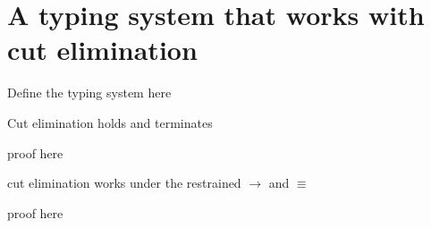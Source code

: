 
\section{A typing system that works with cut elimination}

\begin{definition}
Define the typing system here
\end{definition}

\begin{proposition}
Cut elimination holds and terminates
\end{proposition}

\begin{myproof}
proof here
\end{myproof}

\begin{proposition}
cut elimination works under the restrained $\to$ and $\equiv$
\end{proposition}

\begin{myproof}
proof here
\end{myproof}